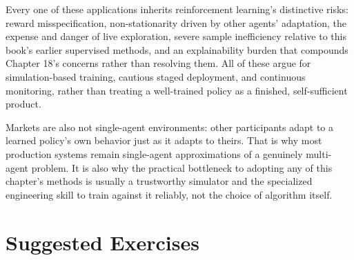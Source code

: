 \documentclass[../ai_in_finance]{subfiles}
\begin{document}
Every one of these applications inherits reinforcement learning's distinctive risks: reward misspecification, non-stationarity driven by other agents' adaptation, the expense and danger of live exploration, severe sample inefficiency relative to this book's earlier supervised methods, and an explainability burden that compounds Chapter 18's concerns rather than resolving them. All of these argue for simulation-based training, cautious staged deployment, and continuous monitoring, rather than treating a well-trained policy as a finished, self-sufficient product.

Markets are also not single-agent environments: other participants adapt to a learned policy's own behavior just as it adapts to theirs. That is why most production systems remain single-agent approximations of a genuinely multi-agent problem. It is also why the practical bottleneck to adopting any of this chapter's methods is usually a trustworthy simulator and the specialized engineering skill to train against it reliably, not the choice of algorithm itself.

\section{Suggested Exercises}
\end{document}
